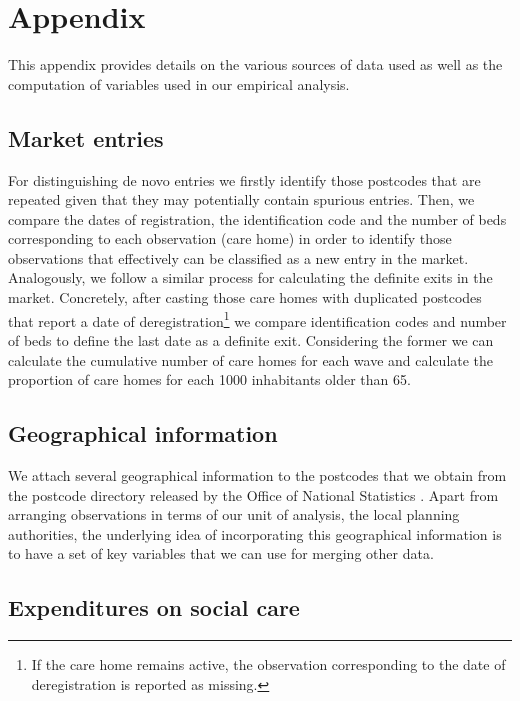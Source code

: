 \documentclass[12pt,letterpaper]{article}
\begin{document}
\newpage
\section*{Appendix}

This appendix provides details on the various sources of data used as well as the computation of variables used in our empirical analysis. 

\subsection*{Market entries}
\label{appendix market_entries}

  For distinguishing de novo entries we firstly identify those postcodes that are repeated given that they may
      potentially contain spurious entries. Then, we compare the dates of registration, the identification code and
       the number of beds corresponding to each observation (care home) in order to identify those observations
        that effectively can be classified as a new entry in the market. Analogously, we follow a similar process for
         calculating the definite exits in the market.  Concretely, after casting those care homes with duplicated
          postcodes that report a date of deregistration\footnote{If the care home remains active,
           the observation corresponding to the date of deregistration is reported as missing.} 
           we compare identification codes and number of beds to define the last date as a definite exit. 
           Considering the former we can calculate the cumulative number of care homes for each wave
            and calculate the proportion of care homes for each 1000 inhabitants older than 65.   
\subsection{Geographical information}

 
  We attach several geographical information to the postcodes that we obtain from the postcode directory
   released by the Office of National Statistics \citep{ons2016}. Apart from arranging observations in terms of
    our unit of analysis, the local planning authorities, the underlying idea of incorporating this geographical
     information is to have a set of key variables that we can use for merging other data.         
     
     
\subsection*{Expenditures on social care} 
\end{document}
